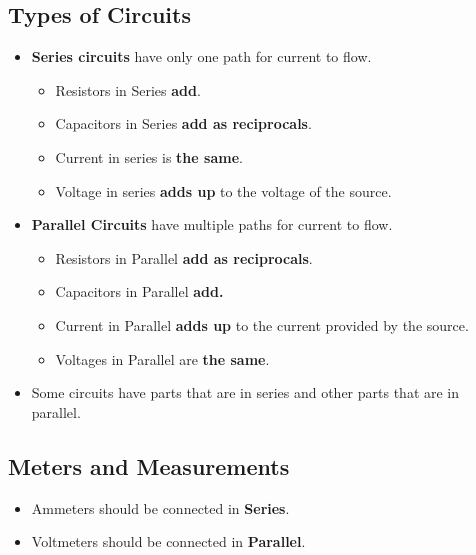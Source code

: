 \documentclass[letterpaper, 12pt]{article}
\begin{document}
\subsection*{Types of Circuits}
	\begin{itemize}
		\item \textbf{Series circuits} have only one path for current to flow.
			\begin{itemize}
				\item Resistors in Series \textbf{add}.
				\item Capacitors in Series \textbf{add as reciprocals}.
				\item Current in series is \textbf{the same}.
				\item Voltage in series \textbf{adds up} to the voltage of the source. 
			\end{itemize}
		\item \textbf{Parallel Circuits} have multiple paths for current to flow. 
			\begin{itemize}
				\item Resistors in Parallel \textbf{add as reciprocals}.
				\item Capacitors in Parallel \textbf{add.}
				\item Current in Parallel \textbf{adds up} to the current provided by the source.
				\item Voltages in Parallel are \textbf{the same}.
			\end{itemize}
		\item Some circuits have parts that are in series and other parts that are in parallel.
	\end{itemize}
\subsection*{Meters and Measurements}
\begin{itemize}
	\item Ammeters should be connected in \textbf{Series}.
	\item Voltmeters should be connected in \textbf{Parallel}.
\end{itemize}
\end{document}
